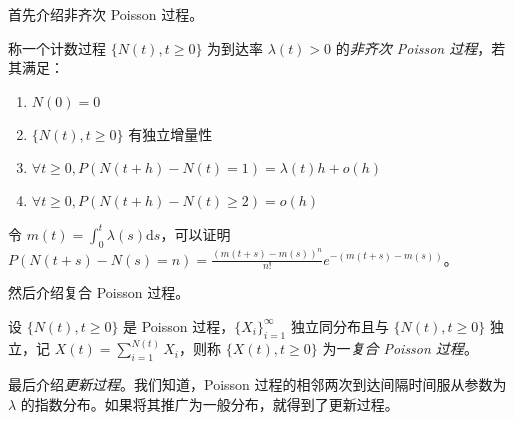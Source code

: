 \documentclass[../main.tex]{subfiles}
\begin{document}
首先介绍非齐次 Poisson 过程。

\begin{definition}\label{def:6.5.1}
    称一个计数过程 $\{N(t),t\geq0\}$ 为到达率 $\lambda(t)>0$ 的\emph{非齐次 Poisson 过程}，若其满足：
    \begin{enumerate}
        \item $N(0)=0$
        \item $\{N(t),t\geq0\}$ 有独立增量性
        \item $\forall t\geq0,P(N(t+h)-N(t)=1)=\lambda(t)h+o(h)$
        \item $\forall t\geq0,P(N(t+h)-N(t)\geq2)=o(h)$
    \end{enumerate}
\end{definition}

令 $m(t)=\int_0^t\lambda(s)\mathrm ds$，可以证明 $P(N(t+s)-N(s)=n)=\frac{(m(t+s)-m(s))^n}{n!}e^{-(m(t+s)-m(s))}$。

然后介绍复合 Poisson 过程。

\begin{definition}\label{def:6.5.2}
    设 $\{N(t),t\geq0\}$ 是 Poisson 过程，$\{X_i\}_{i=1}^\infty$ 独立同分布且与 $\{N(t),t\geq0\}$ 独立，记 $X(t)=\sum_{i=1}^{N(t)}X_i$，则称 $\{X(t),t\geq0\}$ 为一\emph{复合 Poisson 过程}。
\end{definition}

最后介绍\emph{更新过程}。我们知道，Poisson 过程的相邻两次到达间隔时间服从参数为 $\lambda$ 的指数分布。如果将其推广为一般分布，就得到了更新过程。
\end{document}
